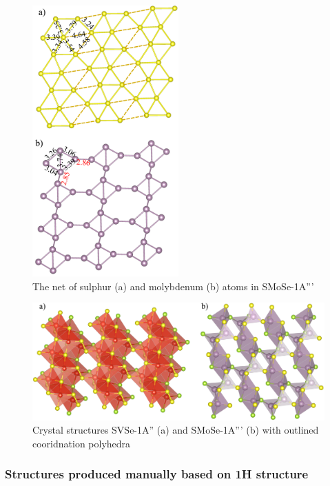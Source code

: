\documentclass[a4paperm]{article}
\begin{document}
\begin{figure}[H]
	\includegraphics[width=0.5\textwidth]{airss3_smose.png}
	\caption{The net of sulphur (a) and molybdenum (b) atoms in SMoSe-1A''' }
	\label{airss3_smose}
\end{figure}


\begin{figure}[H]
	\includegraphics[width=\textwidth]{airss3_poly.png}
	\caption{Crystal structures SVSe-1A'' (a) and SMoSe-1A''' (b) with outlined cooridnation polyhedra}
	\label{airss3_poly}
\end{figure}




\subsubsection{Structures produced manually based on 1H structure}
\end{document}

